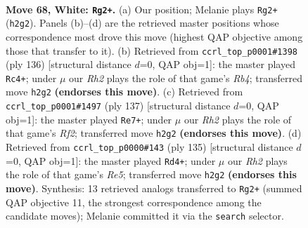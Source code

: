 \documentclass[11pt]{article}
\begin{document}
\clearpage

\begin{figure}[p]\centering
\begin{subfigure}{0.46\textwidth}\centering
\resizebox{\linewidth}{!}{%
\newchessgame
\chessboard[
  setfen={6k1/8/2r5/8/8/8/7R/4K3 w - - 16 68},
  showmover=false,
  pgfstyle=straightmove, color=movearrow, markmove={h2-g2}
]}
\caption{}
\end{subfigure}\hfill
\begin{subfigure}{0.46\textwidth}\centering
\resizebox{\linewidth}{!}{%
\newchessgame
\chessboard[
  setfen={2k5/8/7r/8/1R6/8/8/3K4 w - - 15 69},
  showmover=false,
  pgfstyle=straightmove, color=movearrow, markmove={b4-c4}
]}
\caption{}
\end{subfigure}
\\[4pt]
\begin{subfigure}{0.46\textwidth}\centering
\resizebox{\linewidth}{!}{%
\newchessgame
\chessboard[
  setfen={2R5/5r2/8/8/6k1/8/8/4K3 b - - 18 69},
  showmover=false,
  pgfstyle=straightmove, color=movearrow, markmove={f7-e7}
]}
\caption{}
\end{subfigure}\hfill
\begin{subfigure}{0.46\textwidth}\centering
\resizebox{\linewidth}{!}{%
\newchessgame
\chessboard[
  setfen={8/8/1R6/6k1/4r3/8/3K4/8 b - - 6 68},
  showmover=false,
  pgfstyle=straightmove, color=movearrow, markmove={e4-d4}
]}
\caption{}
\end{subfigure}
\caption{\textbf{Move 68, White: \texttt{Rg2+}.} (a) Our position; Melanie plays \texttt{Rg2+} (\texttt{h2g2}). Panels (b)--(d) are the retrieved master positions whose correspondence most drove this move (highest QAP objective among those that transfer to it). (b) Retrieved from \texttt{ccrl\_top\_p0001\#1398} (ply 136) [structural distance $d$=0, QAP obj=1]: the master played \texttt{Rc4+}; under $\mu$ our \emph{Rh2} plays the role of that game's \emph{Rb4}; transferred move \texttt{h2g2} \textbf{(endorses this move)}. (c) Retrieved from \texttt{ccrl\_top\_p0001\#1497} (ply 137) [structural distance $d$=0, QAP obj=1]: the master played \texttt{Re7+}; under $\mu$ our \emph{Rh2} plays the role of that game's \emph{Rf2}; transferred move \texttt{h2g2} \textbf{(endorses this move)}. (d) Retrieved from \texttt{ccrl\_top\_p0000\#143} (ply 135) [structural distance $d$=0, QAP obj=1]: the master played \texttt{Rd4+}; under $\mu$ our \emph{Rh2} plays the role of that game's \emph{Re5}; transferred move \texttt{h2g2} \textbf{(endorses this move)}. Synthesis: 13 retrieved analogs transferred to \texttt{Rg2+} (summed QAP objective 11, the strongest correspondence among the candidate moves); Melanie committed it via the \texttt{search} selector.}
\label{fig:thought-m134}
\end{figure}
\end{document}
